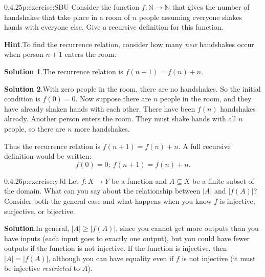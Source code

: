 \documentclass[twoside,11pt,]{book}
\newcommand{\blocktitlefont}{\relax}
\numberwithin{equation}{chapter}
\newcommand{\N}{\mathbb N}
\newcommand{\card}[1]{\left| #1 \right|}
\begin{document}
\begin{divisionsolution}{0.4.25}{}{p:exercise:SBU}%
Consider the function \(f:\N \to \N\) that gives the number of handshakes that take place in a room of \(n\) people assuming everyone shakes hands with everyone else. Give a recursive definition for this function.%
\par\smallskip%
\noindent\textbf{\blocktitlefont Hint}.\quad{}To find the recurrence relation, consider how many \emph{new} handshakes occur when person \(n+1\) enters the room.%
\par\smallskip%
\noindent\textbf{\blocktitlefont Solution 1}.\quad{}The recurrence relation is \(f(n+1) = f(n) + n\).%
\par\smallskip%
\noindent\textbf{\blocktitlefont Solution 2}.\quad{}With zero people in the room, there are no handshakes. So the initial condition is \(f(0) = 0\). Now suppose there are \(n\) people in the room, and they have already shaken hands with each other. There have been \(f(n)\) handshakes already. Another person enters the room. They must shake hands with all \(n\) people, so there are \(n\) more handshakes.%
\par
Thus the recurrence relation is \(f(n+1) = f(n) + n\). A full recursive definition would be written:%
\begin{equation*}
f(0) = 0;~ f(n+1) = f(n) + n\text{.}
\end{equation*}
%
\end{divisionsolution}%
\begin{divisionsolution}{0.4.26}{}{p:exercise:yJd}%
Let \(f:X \to Y\) be a function and \(A \subseteq X\) be a finite subset of the domain. What can you say about the relationship between \(\card{A}\) and \(\card{f(A)}\)? Consider both the general case and what happens when you know \(f\) is injective, surjective, or bijective.%
\par\smallskip%
\noindent\textbf{\blocktitlefont Solution}.\quad{}In general, \(\card{A} \ge \card{f(A)}\), since you cannot get more outputs than you have inputs (each input goes to exactly one output), but you could have fewer outputs if the function is not injective. If the function is injective, then \(\card{A} = \card{f(A)}\), although you can have equality even if \(f\) is not injective (it must be injective \emph{restricted} to \(A\)).%
\end{divisionsolution}%
\end{document}

